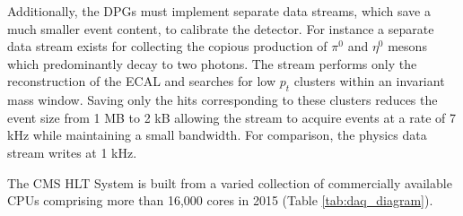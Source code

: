 Additionally, the DPGs must implement separate data streams, which save a much
smaller event content, to calibrate the detector. For instance a separate data stream exists for collecting
the copious production of $\pi^0$ and $\eta^0$ mesons which predominantly decay to two photons. The stream 
performs only the reconstruction of the ECAL and searches for low $p_t$ clusters within an invariant mass window. 
Saving only the hits corresponding to these clusters reduces the event size from 1 MB to 2 kB allowing the stream
to acquire events at a rate of 7 kHz while maintaining a small bandwidth. For comparison, the physics data 
stream writes at 1 kHz. 

The CMS HLT System is built from a varied collection of commercially
 available CPUs  comprising more than 16,000 cores  in 2015 (Table \ref{tab:daq_diagram}). 
